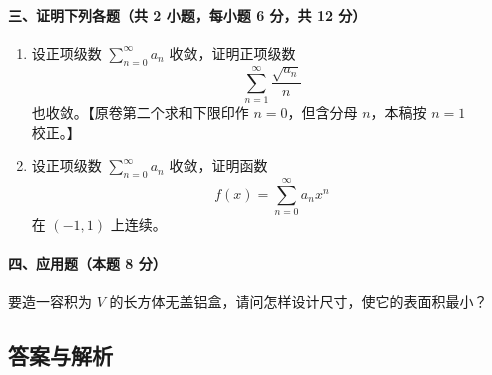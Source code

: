 \paragraph*{三、证明下列各题（共 2 小题，每小题 6 分，共 12 分）}
\begin{enumerate}
  \item 设正项级数 $\sum_{n=0}^{\infty}a_n$ 收敛，证明正项级数
  \[
    \sum_{n=1}^{\infty}\frac{\sqrt{a_n}}{n}
  \]
  也收敛。【原卷第二个求和下限印作 $n=0$，但含分母 $n$，本稿按 $n=1$ 校正。】
  \item 设正项级数 $\sum_{n=0}^{\infty}a_n$ 收敛，证明函数
  \[
    f(x)=\sum_{n=0}^{\infty}a_nx^n
  \]
  在 $(-1,1)$ 上连续。
\end{enumerate}

\paragraph*{四、应用题（本题 8 分）}
要造一容积为 $V$ 的长方体无盖铝盒，请问怎样设计尺寸，使它的表面积最小？

\subsection{答案与解析}


